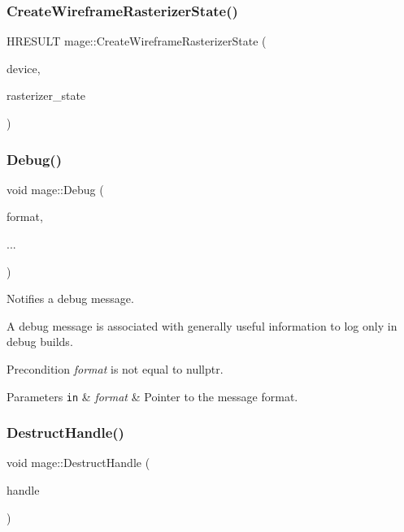 \subsubsection{\texorpdfstring{Create\+Wireframe\+Rasterizer\+State()}{CreateWireframeRasterizerState()}}
{\footnotesize\ttfamily H\+R\+E\+S\+U\+LT mage\+::\+Create\+Wireframe\+Rasterizer\+State (\begin{DoxyParamCaption}\item[{I\+D3\+D11\+Device2 $\ast$}]{device,  }\item[{I\+D3\+D11\+Rasterizer\+State $\ast$$\ast$}]{rasterizer\+\_\+state }\end{DoxyParamCaption})}

\hypertarget{namespacemage_a1bcf1f0301e170105908eee5b5c46830}{}\label{namespacemage_a1bcf1f0301e170105908eee5b5c46830} 
\subsubsection{\texorpdfstring{Debug()}{Debug()}}
{\footnotesize\ttfamily void mage\+::\+Debug (\begin{DoxyParamCaption}\item[{const char $\ast$}]{format,  }\item[{}]{... }\end{DoxyParamCaption})}

Notifies a debug message.

A debug message is associated with generally useful information to log only in debug builds.

\begin{DoxyPrecond}{Precondition}
{\itshape format} is not equal to {\ttfamily nullptr}. 
\end{DoxyPrecond}

\begin{DoxyParams}[1]{Parameters}
\mbox{\tt in}  & {\em format} & Pointer to the message format. \\
\hline
\end{DoxyParams}
\hypertarget{namespacemage_a7bf12816896ea8d126d397f0c6d571b1}{}\label{namespacemage_a7bf12816896ea8d126d397f0c6d571b1} 
\subsubsection{\texorpdfstring{Destruct\+Handle()}{DestructHandle()}}
{\footnotesize\ttfamily void mage\+::\+Destruct\+Handle (\begin{DoxyParamCaption}\item[{H\+A\+N\+D\+LE}]{handle }\end{DoxyParamCaption})}

